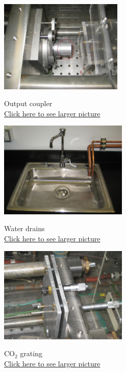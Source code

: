 \documentclass{../lab}
\begin{document}
\begin{figure}[H]
  \href{http://experimentationlab.berkeley.edu/sites/default/files/images/outputcoupler.jpg}{\includegraphics[height=125pt,keepaspectratio]{images/outputcoupler.jpg}}
  \caption{Output coupler\\ \href{http://experimentationlab.berkeley.edu/sites/default/files/images/outputcoupler.jpg}{Click here to see larger picture}}
  \label{fig:OutputCoupler}
\endminipage\hfill
{}
\centering
  \href{http://experimentationlab.berkeley.edu/sites/default/files/images/Water_Drains_3531.jpg}{\includegraphics[height=130pt,keepaspectratio]{images/Water_Drains_3531.jpg}}
  \caption{Water drains \\
  \href{http://experimentationlab.berkeley.edu/sites/default/files/images/Water_Drains_3531.jpg}{Click here to see larger picture}}
  \label{fig:WaterDrains}
\endminipage\hfill
{}
\centering
  \href{http://experimentationlab.berkeley.edu/sites/default/files/CO-2/Co-2-Grating_3641_0.JPG}{\includegraphics[height=130pt,keepaspectratio]{images/Co-2-Grating_3641_0.JPG}}
  \caption{CO$_2$ grating \\ \href{http://experimentationlab.berkeley.edu/sites/default/files/CO-2/Co-2-Grating_3641_0.JPG}{Click here to see larger picture}}\label{fig:Grating}
\endminipage
\end{figure}
\end{document}
